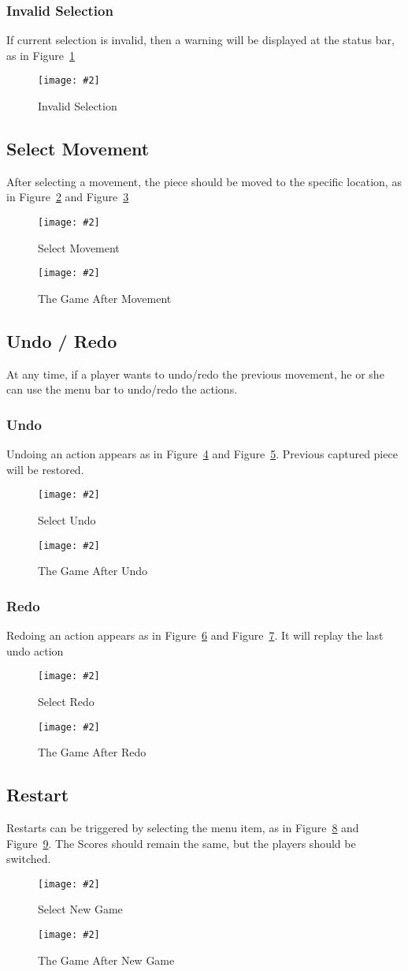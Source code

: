 \documentclass[12pt]{article}
\newcommand{\img}[3]{
\begin{figure}[!ht]
\begin{center}
\texttt{[image: \#2]}
\caption{#3}\label{#2}
\end{center}
\end{figure}
}
\begin{document}
\subsubsection{Invalid Selection}
If current selection is invalid, then a warning will be displayed at the status bar, as in Figure~\ref{board_invalid_selection}
\img{0.4}{board_invalid_selection}{Invalid Selection}

\subsection{Select Movement}
After selecting a movement, the piece should be moved to the specific location, as in Figure~\ref{board_select_movement} and Figure~\ref{board_after_movement}
\img{0.4}{board_select_movement}{Select Movement}
\img{0.4}{board_after_movement}{The Game After Movement}


\subsection{Undo / Redo}

At any time, if a player wants to undo/redo the previous movement, he or she can use the menu bar to undo/redo the actions.

\subsubsection{Undo}
Undoing an action appears as in Figure~\ref{board_undo} and Figure~\ref{board_after_undo}. Previous captured piece will be restored.
\img{0.4}{board_undo}{Select Undo}
\img{0.4}{board_after_undo}{The Game After Undo}

\subsubsection{Redo}
Redoing an action appears as in Figure~\ref{board_redo} and Figure~\ref{board_after_redo}. It will replay the last undo action
\img{0.4}{board_redo}{Select Redo}
\img{0.4}{board_after_redo}{The Game After Redo}

\subsection{Restart}
Restarts can be triggered by selecting the menu item, as in Figure~\ref{board_newgame} and Figure~\ref{board_after_newgame}. The Scores should remain the same, but the players should be switched.
\img{0.4}{board_newgame}{Select New Game}
\img{0.4}{board_after_newgame}{The Game After New Game}




\end{document}

